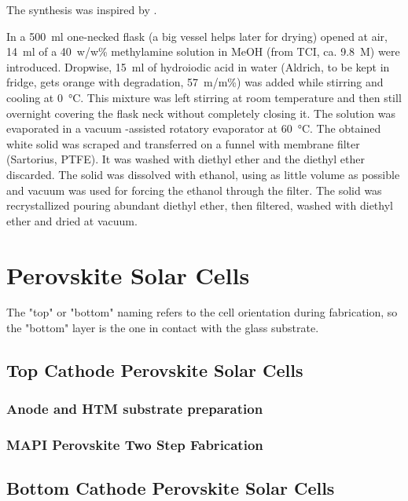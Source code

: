 		The synthesis was inspired by \cite{Im2011a, Aharon2014, Williams2014, Etgar2012a, Nagaoka2015}.
		
		In a \SI{500}{\milli\litre} one-necked flask (a big vessel helps later for drying) opened at air, \SI{14}{\milli\litre} of a 40~w/w\% methylamine solution in MeOH (from TCI, ca. 9.8~M) were introduced. Dropwise, \SI{15}{\milli\litre} of hydroiodic acid in water (Aldrich, to be kept in fridge, gets orange with degradation, 57~m/m\%) was added while stirring and cooling at \SI{0}{\celsius}. This mixture was left stirring at room temperature and then still overnight covering the flask neck without completely closing it.
		The solution was evaporated in a vacuum -assisted rotatory evaporator at \SI{60}{\celsius}.
		The obtained white solid was scraped and transferred on a funnel with membrane filter (Sartorius, PTFE). It was washed with diethyl ether and the diethyl ether discarded. The solid was dissolved with ethanol, using as little volume as possible and vacuum was used for forcing the ethanol through the filter. The solid was recrystallized pouring abundant diethyl ether, then filtered, washed with diethyl ether and dried at vacuum.

\section{Perovskite Solar Cells}

	The "top" or "bottom" naming refers to the cell orientation during fabrication, so the "bottom" layer is the one in contact with the glass substrate. 

	\subsection{Top Cathode Perovskite Solar Cells}

		\subsubsection{Anode and HTM substrate preparation}
		
		\subsubsection{MAPI Perovskite Two Step Fabrication}
	
	\subsection{Bottom Cathode Perovskite Solar Cells}
	
